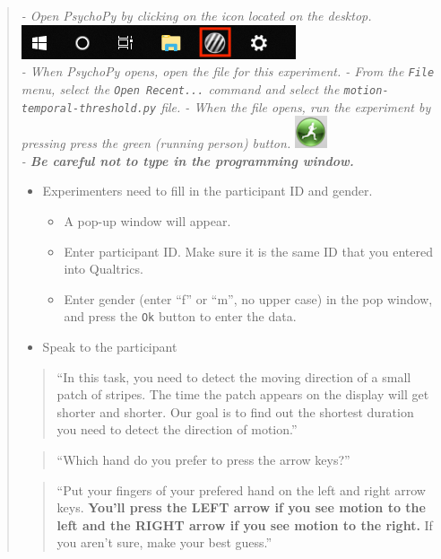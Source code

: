 \documentclass[]{article}
\providecommand{\tightlist}{%
  \setlength{\itemsep}{0pt}\setlength{\parskip}{0pt}}
\begin{document}
\begin{quote}
\emph{- Open PsychoPy by clicking on the icon located on the desktop.
\includegraphics{images/PsychoPy-1.PNG}\\
- When PsychoPy opens, open the file for this experiment. - From the
\texttt{File} menu, select the \texttt{Open\ Recent...} command and
select the \texttt{motion-temporal-threshold.py} file. - When the file
opens, run the experiment by pressing press the green (running person)
button. \includegraphics{images/PPrunningMan.png}\\
- \textbf{Be careful not to type in the programming window.}}

\begin{itemize}
\tightlist
>>>>>>> 68c3b652bc9fce1eaa5ec75263380cb3ee4d3281
\item
  Experimenters need to fill in the participant ID and gender.

  \begin{itemize}
  \tightlist
  \item
    A pop-up window will appear.
  \item
    Enter participant ID. Make sure it is the same ID that you entered
    into Qualtrics.
  \item
    Enter gender (enter ``f'' or ``m'', no upper case) in the pop
    window, and press the \texttt{Ok} button to enter the data.
  \end{itemize}
\item
  Speak to the participant
\end{itemize}

\begin{quote}
``In this task, you need to detect the moving direction of a small patch
of stripes. The time the patch appears on the display will get shorter
and shorter. Our goal is to find out the shortest duration you need to
detect the direction of motion.''
\end{quote}

\begin{quote}
``Which hand do you prefer to press the arrow keys?''
\end{quote}

\begin{quote}
``Put your fingers of your prefered hand on the left and right arrow
keys. \textbf{You'll press the LEFT arrow if you see motion to the left
and the RIGHT arrow if you see motion to the right.} If you aren't sure,
make your best guess.''
\end{quote}


\end{quote}
\end{document}
